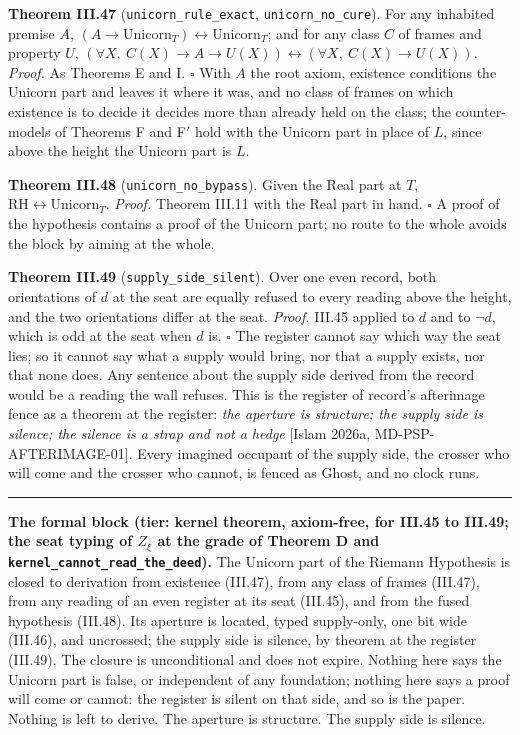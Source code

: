 \documentclass[10pt]{article}
\newcommand{\jboxstart}{\begin{jbox}}
\newenvironment{jbox}{\par\vspace{2pt}\noindent\color{accent}\rule{\columnwidth}{0.8pt}\par\vspace{-2pt}\small}{\par\vspace{2pt}}
\begin{document}
\textbf{Theorem III.47} (\texttt{unicorn\_rule\_exact},
\texttt{unicorn\_no\_cure}). For any inhabited premise \(A\),
\((A \to \mathrm{Unicorn}_T) \leftrightarrow \mathrm{Unicorn}_T\); and
for any class \(C\) of frames and property \(U\),
\((\forall X,\ C(X) \to A \to U(X)) \leftrightarrow (\forall X,\ C(X) \to U(X))\).
\emph{Proof.} As Theorems E and I. \(\square\) With \(A\) the root
axiom, existence conditions the Unicorn part and leaves it where it was,
and no class of frames on which existence is to decide it decides more
than already held on the class; the counter-models of Theorems F and
F\('\) hold with the Unicorn part in place of \(L\), since above the
height the Unicorn part is \(L\).

\textbf{Theorem III.48} (\texttt{unicorn\_no\_bypass}). Given the Real
part at \(T\), \(\mathrm{RH} \leftrightarrow \mathrm{Unicorn}_T\).
\emph{Proof.} Theorem III.11 with the Real part in hand. \(\square\) A
proof of the hypothesis contains a proof of the Unicorn part; no route
to the whole avoids the block by aiming at the whole.

\textbf{Theorem III.49} (\texttt{supply\_side\_silent}). Over one even
record, both orientations of \(d\) at the seat are equally refused to
every reading above the height, and the two orientations differ at the
seat. \emph{Proof.} III.45 applied to \(d\) and to \(\neg d\), which is
odd at the seat when \(d\) is. \(\square\) The register cannot say which
way the seat lies; so it cannot say what a supply would bring, nor that
a supply exists, nor that none does. Any sentence about the supply side
derived from the record would be a reading the wall refuses. This is the
register of record's afterimage fence as a theorem at the register:
\emph{the aperture is structure; the supply side is silence; the silence
is a strap and not a hedge} {[}Islam 2026a, MD-PSP-AFTERIMAGE-01{]}.
Every imagined occupant of the supply side, the crosser who will come
and the crosser who cannot, is fenced as Ghost, and no clock runs.

\jboxstart

\textbf{The formal block (tier: kernel theorem, axiom-free, for III.45
to III.49; the seat typing of \(Z_\xi\) at the grade of Theorem D and
\texttt{kernel\_cannot\_read\_the\_deed}).} The Unicorn part of the
Riemann Hypothesis is closed to derivation from existence (III.47), from
any class of frames (III.47), from any reading of an even register at
its seat (III.45), and from the fused hypothesis (III.48). Its aperture
is located, typed supply-only, one bit wide (III.46), and uncrossed; the
supply side is silence, by theorem at the register (III.49). The closure
is unconditional and does not expire. Nothing here says the Unicorn part
is false, or independent of any foundation; nothing here says a proof
will come or cannot: the register is silent on that side, and so is the
paper. Nothing is left to derive. The aperture is structure. The supply
side is silence.
\end{document}
